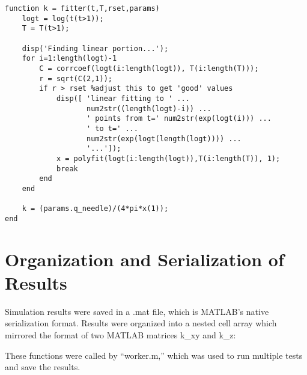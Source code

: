 \small
\begin{verbatim}
function k = fitter(t,T,rset,params)
    logt = log(t(t>1));
    T = T(t>1);

    disp('Finding linear portion...');    
    for i=1:length(logt)-1
        C = corrcoef(logt(i:length(logt)), T(i:length(T)));
        r = sqrt(C(2,1));
        if r > rset %adjust this to get 'good' values
            disp([ 'linear fitting to ' ...
                   num2str((length(logt)-i)) ...
                   ' points from t=' num2str(exp(logt(i))) ...
                   ' to t=' ...
                   num2str(exp(logt(length(logt)))) ...
                   '...']);
            x = polyfit(logt(i:length(logt)),T(i:length(T)), 1);
            break
        end
    end

    k = (params.q_needle)/(4*pi*x(1));
end
\end{verbatim}
\normalsize

\section{Organization and Serialization of Results}

Simulation results were saved in a .mat file, which is MATLAB's native
serialization format. Results were organized into a nested cell array which
mirrored the format of two MATLAB matrices k\_xy and k\_z:

These functions were called by ``worker.m,'' which was used to run multiple
tests and save the results.

